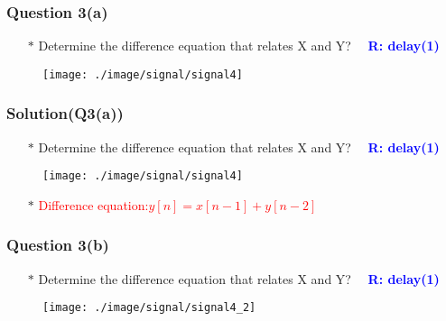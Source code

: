 \documentclass{beamer}
\newcommand{\blue}[1]{\textcolor{blue}{#1}}
\newcommand{\red}[1]{\textcolor{red}{#1}}
\begin{document}

\begin{frame}
\frametitle{Question 3(a)}

\begin{itemize} \itemsep1pt \parskip0pt 
  \item[$\ast$] Determine the difference equation that relates X and Y?  ~~\blue{\bf R: delay(1)}
\end{itemize}
\vspace{20 mm}


\begin{figure}[H]
  \centering
  \texttt{[image: ./image/signal/signal4]}
\end{figure}
\vspace{10 mm}

\end{frame}


\begin{frame}
\frametitle{Solution(Q3(a))}

\begin{itemize} \itemsep1pt \parskip0pt 
  \item[$\ast$] Determine the difference equation that relates X and Y?  ~~\blue{\bf R: delay(1)}
\end{itemize}
\vspace{10 mm}


\begin{figure}[H]
  \centering
  \texttt{[image: ./image/signal/signal4]}
\end{figure}


\begin{itemize} \itemsep1pt \parskip0pt 
  \item[$\ast$] \red{Difference equation:$y[n] = x[n-1] + y[n-2]$}
\end{itemize}

\end{frame}


\begin{frame}
\frametitle{Question 3(b)}

\begin{itemize} \itemsep1pt \parskip0pt 
  \item[$\ast$] Determine the difference equation that relates X and Y?  ~~\blue{\bf R: delay(1)}
\end{itemize}
\vspace{10 mm}


\begin{figure}[H]
  \centering
  \texttt{[image: ./image/signal/signal4\_2]}
\end{figure}


\end{frame}
\end{document}
